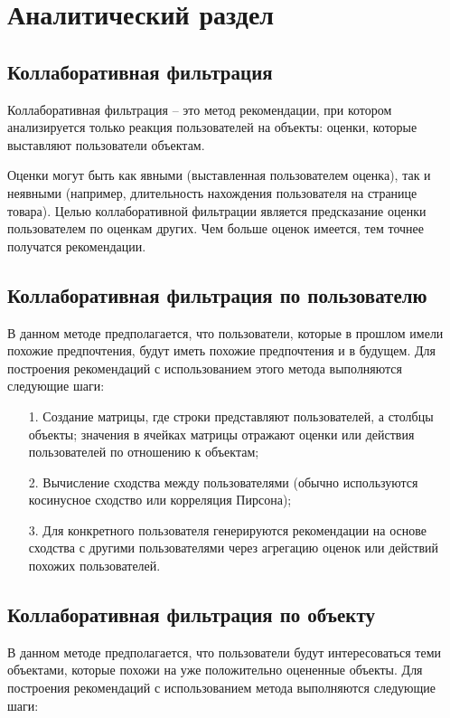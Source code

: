 \section{Аналитический раздел}

\subsection{Коллаборативная фильтрация}

Коллаборативная фильтрация -- это метод рекомендации, при котором анализируется только реакция пользователей на объекты: оценки, которые выставляют пользователи объектам. \cite{collabFilter}

Оценки могут быть как явными (выставленная пользователем оценка), так и неявными (например, длительность нахождения пользователя на странице товара). Целью коллаборативной фильтрации является предсказание оценки пользователем по оценкам других. Чем больше оценок имеется, тем точнее получатся рекомендации. \cite{collabFilter} 

\subsection{Коллаборативная фильтрация по пользователю}

В данном методе предполагается, что пользователи, которые в прошлом имели похожие предпочтения, будут иметь похожие предпочтения и в будущем. Для построения рекомендаций с использованием этого метода выполняются следующие шаги:

\begin{enumerate}
	\item[1.] Создание матрицы, где строки представляют пользователей, а столбцы объекты; значения в ячейках матрицы отражают оценки или действия пользователей по отношению к объектам;
	\item[2.] Вычисление сходства между пользователями (обычно используются косинусное сходство или корреляция Пирсона);
	\item[3.] Для конкретного пользователя генерируются рекомендации на основе сходства с другими пользователями через агрегацию оценок или действий похожих пользователей.
\end{enumerate}

\subsection{Коллаборативная фильтрация по объекту}

В данном методе предполагается, что пользователи будут интересоваться теми объектами, которые похожи на уже положительно оцененные объекты. Для построения рекомендаций с использованием метода выполняются следующие шаги:

